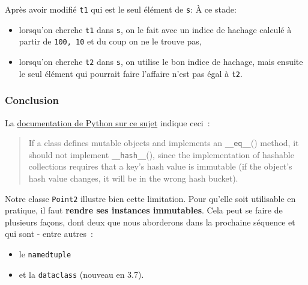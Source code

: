 Après avoir modifié \texttt{t1} qui est le seul élément de \texttt{s}: À
ce stade:

\begin{itemize}
\tightlist
\item
  lorsqu'on cherche \texttt{t1} dans \texttt{s}, on le fait avec un
  indice de hachage calculé à partir de \texttt{100,\ 10} et du coup on
  ne le trouve pas,
\item
  lorsqu'on cherche \texttt{t2} dans \texttt{s}, on utilise le bon
  indice de hachage, mais ensuite le seul élément qui pourrait faire
  l'affaire n'est pas égal à \texttt{t2}.
\end{itemize}

    \hypertarget{conclusion}{%
\subsubsection{Conclusion}\label{conclusion}}

    La
\href{https://docs.python.org/3/reference/datamodel.html\#object.__hash__}{documentation
de Python sur ce sujet} indique ceci~:

\begin{quote}
If a class defines mutable objects and implements an
\texttt{\_\_eq\_\_}() method, it should not implement
\texttt{\_\_hash\_\_}(), since the implementation of hashable
collections requires that a key's hash value is immutable (if the
object's hash value changes, it will be in the wrong hash bucket).
\end{quote}

    Notre classe \texttt{Point2} illustre bien cette limitation. Pour
qu'elle soit utilisable en pratique, il faut \textbf{rendre ses
instances immutables}. Cela peut se faire de plusieurs façons, dont deux
que nous aborderons dans la prochaine séquence et qui sont - entre
autres~:

\begin{itemize}
\tightlist
\item
  le \texttt{namedtuple}
\item
  et la \texttt{dataclass} (nouveau en 3.7).
\end{itemize}